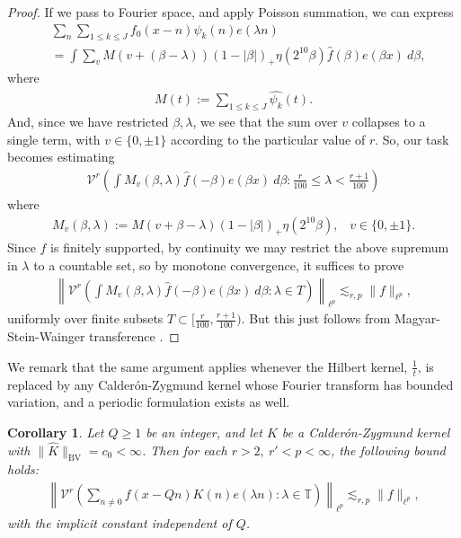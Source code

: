 \documentclass[12pt]{amsart}
\numberwithin{equation}{section}
\newtheorem{cor}[theorem]{Corollary}
\theoremstyle{definition}
\begin{document}
\begin{proof}
If we pass to Fourier space, and apply Poisson summation, we can express
\begin{align}
    &\sum_{n}\sum_{1 \leq k \leq J} f_0(x-n) \psi_k(n) e(\lambda n)  \\
    & = \int \sum_v M( v + (\beta - \lambda)) (1 - |\beta|)_+ \eta(2^{10} \beta) \widehat{f}(\beta) e(\beta x) \ d\beta,
\end{align}
where
\begin{align}
    M(t) := \sum_{1 \leq k \leq J} \widehat{\psi_k}(t).
\end{align}
And, since we have restricted $\beta,\lambda$, we see that the sum over $v$ collapses to a single term, with $v \in \{0, \pm 1\}$ according to the particular value of $r$. So, our task becomes estimating
\begin{align}
   \mathcal{V}^r\left( \int M_{v}(\beta, \lambda) \widehat{f}(-\beta) e(\beta x) \ d\beta :  \frac{r}{100} \leq \lambda < \frac{r+1}{100} \right)
\end{align}
where
\begin{align}
   M_{v}(\beta,\lambda) := M( v + \beta - \lambda ) (1 - |\beta|)_+ \eta(2^{10} \beta), \; \; \; v \in \{0, \pm 1\}.
\end{align}
Since $f$ is finitely supported, by continuity we may restrict the above supremum in $\lambda$ to a countable set, so by monotone convergence, it suffices to prove
\begin{align}
 \left  \|   \mathcal{V}^r\left( \int M_{v}(\beta, \lambda) \widehat{f}(-\beta) e(\beta x) \ d\beta : \lambda \in T \right) \right\|_{\ell^p} \lesssim_{r,p}  \| f\|_{\ell^p},
\end{align}
uniformly over finite subsets $T \subset [\frac{r}{100},\frac{r+1}{100})$. But this just follows from Magyar-Stein-Wainger transference \cite{MSW}.
\end{proof}

We remark that the same argument applies whenever the Hilbert kernel, $\frac{1}{t}$, is replaced by any Calder\'{o}n-Zygmund kernel whose Fourier transform has bounded variation, and a periodic formulation exists as well.

\begin{cor}\label{c:disc}
Let $Q \geq 1$ be an integer, and let $K$ be a Calder\'{o}n-Zygmund kernel with $\| \widehat{K} \|_{\text{BV}} = c_0 < \infty$.
Then for each $r > 2, \ r' < p < \infty$, the following bound holds:
    \begin{align}
     \left   \| \mathcal{V}^r \left( \sum_{n \neq 0 } f(x-Q n) K(n) e(\lambda n) : \lambda \in \mathbb{T} \right)\right \|_{\ell^p} \lesssim_{r,p}  \| f\|_{\ell^p},
    \end{align}
    with the implicit constant independent of $Q$.
\end{cor}
\end{document}

